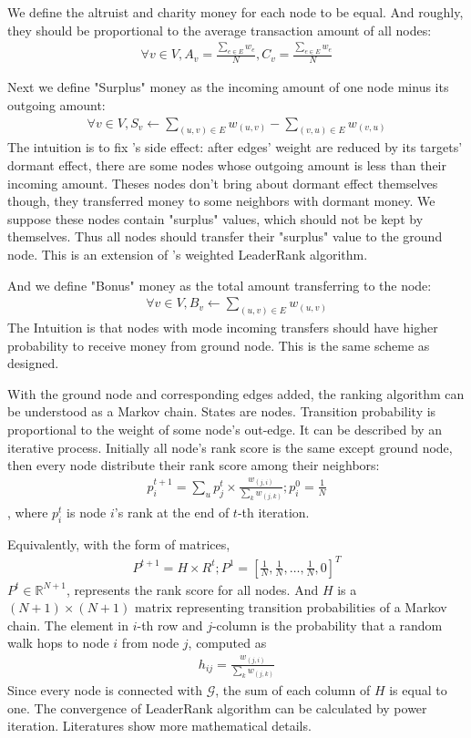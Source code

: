 We define the altruist and charity money for each node to be equal. And roughly, they should be proportional to the average transaction amount of all nodes:
\begin{align}
\forall v \in V, A_v = \frac{\sum_{e\in E} w_e}{N}, C_v =  \frac{\sum_{e\in E} w_e}{N}
\end{align}

Next we define "Surplus" money as the incoming amount of one node minus its outgoing amount:
\begin{align}
	\forall v \in V, S_v \leftarrow \sum_{(u,v)\in E} w_{(u,v)} - \sum_{(v,u) \in E} w_{(v,u) }
\end{align}
The intuition is to fix 's side effect: after edges' weight are reduced by its targets' dormant effect, there are some nodes whose outgoing amount is less than their incoming amount. Theses nodes don't bring about dormant effect themselves though, they transferred money to some neighbors with dormant money. We suppose these nodes contain "surplus" values, which should not be kept by themselves. Thus all nodes should transfer their "surplus" value to the ground node. This is an extension of \textcite{Li2014}'s weighted LeaderRank algorithm.

And we define "Bonus" money as the total amount transferring to the node:
\begin{align}
	\forall v \in V, B_v \leftarrow \sum_{(u,v) \in E} w_{(u,v)}
\end{align}
The Intuition is that nodes with mode incoming transfers should have higher probability to receive money from ground node. This is the same scheme as \textcite{Li2014} designed.

With the ground node and corresponding edges added, the ranking algorithm can be understood as a Markov chain. States are nodes. Transition probability is proportional to the weight of some node's out-edge. It can be described by an iterative process. Initially all node's rank score is the same except ground node, then every node distribute their rank score among their neighbors:
\begin{align}
	p_i^{t+1} = \sum_u p_j^t \times \frac{ w_{(j,i)} }{ \sum_k w_{(j,k)} }; p_i^0 = \frac{1}{N}
\end{align}
, where $p_i^t$ is node $i$'s rank at the end of $t$-th iteration.

Equivalently, with the form of matrices,
\begin{align}
	P^{t+1} = H \times R^{t}; P^1=[\frac{1}{N}, \frac{1}{N}, \dots, \frac{1}{N}, 0]^T
\end{align}
$P^t \in \mathbb{R}^{N+1}$, represents the rank score for all nodes. And $H$ is a $(N+1)\times (N+1)$ matrix representing transition probabilities of a Markov chain. The element in $i$-th row and $j$-column is the probability that a random walk hops to node $i$ from node $j$, computed as
\begin{align}
h_{ij} = \frac{w_{(j,i)}}{\sum_k w_{(j,k)}}
\end{align}
Since every node is connected with $\mathcal{G}$, the sum of each column of $H$ is equal to one. The convergence of LeaderRank algorithm can be calculated by power iteration. Literatures\cite{Li2014}\cite{Chen2013} show more mathematical details.

